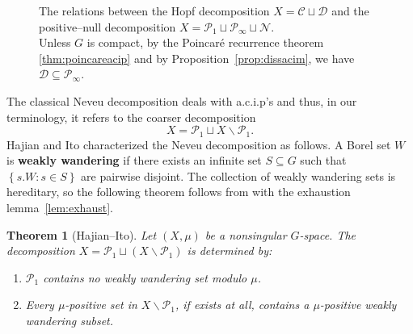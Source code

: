 \documentclass{amsart}
\numberwithin{equation}{subsection}
\newtheorem{thm}{Theorem}[section]
\begin{document}
\begin{figure}
    \centering

    \caption[.]{The relations between the Hopf decomposition \(X=\mathcal{C}\sqcup\mathcal{D}\) and the positive--null decomposition \(X=\mathcal{P}_{1}\sqcup\mathcal{P}_{\infty}\sqcup\mathcal{N}\).\\ 
    Unless \(G\) is compact, by the Poincar\'{e} recurrence theorem \ref{thm:poincareacip} and by Proposition~\ref{prop:dissacim}, we have \(\mathcal{D}\subseteq\mathcal{P}_\infty\).}
\label{Figure: decompositions}
\end{figure}

The classical Neveu decomposition deals with {\sc a.c.i.p}'s and thus, in our terminology, it refers to the coarser decomposition
\[X=\mathcal{P}_{1}\sqcup X\backslash\mathcal{P}_{1}.\]
Hajian and Ito characterized the Neveu decomposition as follows. A Borel set \(W\) is {\bf weakly wandering} if there exists an infinite set \(S\subseteq G\) such that \(\left\{s.W:s\in S\right\}\) are pairwise disjoint. The collection of weakly wandering sets is hereditary, so the following theorem follows from \cite[Theorem 1]{hajian1969weakly} with the exhaustion lemma~\ref{lem:exhaust}.

\begin{thm}[Hajian--Ito]
Let \(\left(X,\mu\right)\) be a nonsingular \(G\)-space. The decomposition \(X=\mathcal{P}_{1}\sqcup\left(X\backslash\mathcal{P}_{1}\right)\) is determined by:
\begin{enumerate}
    \item \(\mathcal{P}_{1}\) contains no weakly wandering set modulo \(\mu\).
    \item Every \(\mu\)-positive set in \(X\backslash\mathcal{P}_{1}\), if exists at all, contains a \(\mu\)-positive weakly wandering subset.
\end{enumerate}
\end{thm}
\end{document}
